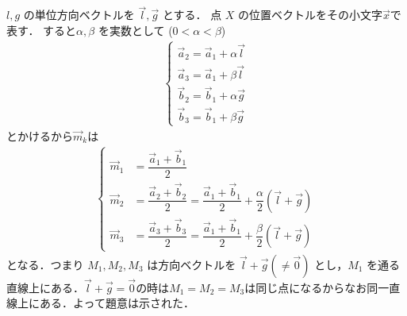 \documentclass[../../main.tex]{subfiles}
\begin{document}
$l, g$ の単位方向ベクトルを $\vec{l}, \vec{g}$ とする．
点 $X$ の位置ベクトルをその小文字$\vec{x}$で表す．
すると$\alpha, \beta$ を実数として ($0 < \alpha < \beta$)
\begin{align}
  \begin{cases}
    \vec{a}_2 = \vec{a}_1 + \alpha \vec{l} \\
    \vec{a}_3 = \vec{a}_1 + \beta \vec{l} \\
    \vec{b}_2 = \vec{b}_1 + \alpha \vec{g} \\
    \vec{b}_3 = \vec{b}_1 + \beta \vec{g}
  \end{cases}
\end{align}
とかけるから$\vec{m}_{k}$は
\begin{align}
  \begin{cases}
    \vec{m}_1 &= \dfrac{\vec{a}_1 + \vec{b}_1}{2} \\
    \vec{m}_2 &= \dfrac{\vec{a}_2+\vec{b}_2}{2} = \dfrac{\vec{a}_1 + \vec{b}_1}{2} + \dfrac{\alpha}{2}(\vec{l} + \vec{g}) \\
    \vec{m}_3 &= \dfrac{\vec{a}_3+\vec{b}_3}{2} = \dfrac{\vec{a}_1 + \vec{b}_1}{2} + \dfrac{\beta}{2}(\vec{l} + \vec{g})
  \end{cases}
\end{align}
となる．つまり $M_1, M_2, M_3$ は方向ベクトルを $\vec{l} + \vec{g} ( \neq \vec{0})$ とし，$M_1$ を通る直線上にある．$\vec{l} + \vec{g}=\vec{0}$の時は$M_1=M_2=M_3$は同じ点になるからなお同一直線上にある．よって題意は示された．

\newpage
\end{document}
